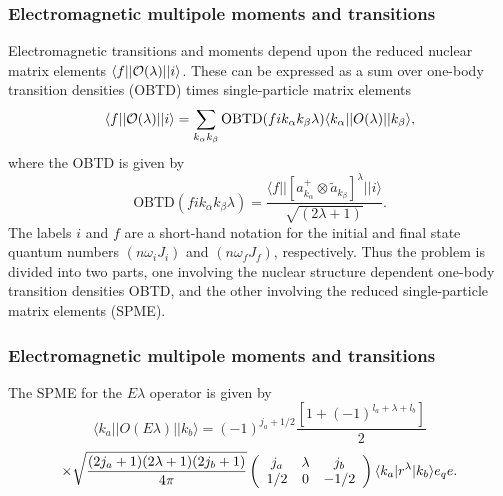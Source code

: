 \documentclass{beamer}
\begin{document}
\begin{frame}
\frametitle{Electromagnetic multipole moments and transitions}

\begin{block}{}
Electromagnetic transitions and moments depend upon the reduced nuclear
matrix elements $\langle f\vert\vert {\cal O}(\lambda )\vert\vert i\rangle$. These can be expressed as a sum over one-body transition
densities (OBTD) times single-particle matrix elements
\[
\langle f\vert\vert {\cal O}(\lambda )\vert\vert i\rangle
=\sum _{k_{\alpha } k_{\beta }}\mathrm{OBTD}(f i k_{\alpha } k_{\beta } \lambda )
 \langle k_{\alpha }\vert\vert O(\lambda )\vert\vert k_{\beta }\rangle, 
\]
where the OBTD is given by
\[
\mathrm{OBTD}(f i k_{\alpha} k_{\beta}\lambda)= \frac{\langle f\vert\vert [a^{+}_{k_{\alpha }}\otimes \tilde{a}_{k_{\beta }}]^{\lambda }\vert\vert i\rangle}{\sqrt{(2\lambda +1)}}. 
\]
The labels $i$ and $f$ are a short-hand notation for the initial
and final state quantum numbers $(n \omega _{i}J_{i})$ and $(n\omega_{f}J_{f})$,
respectively. Thus the problem is divided into two parts, one
involving the nuclear structure dependent one-body transition
densities OBTD, and the other involving the reduced
single-particle matrix
elements (SPME).
\end{block}
\end{frame}

\begin{frame}
\frametitle{Electromagnetic multipole moments and transitions}

\begin{block}{}
The SPME for the $E\lambda$ operator is given by
\[
\langle k_{a}\vert\vert O(E\lambda )\vert\vert k_{b}\rangle=(-1)^{j_{a}+1/2}\frac{[1+(-1)^{l_{a}+\lambda +l_{b}}]}{2}
\]
\[
 \times\sqrt{ {(2j_{a}+1)(2\lambda +1)(2j_{b}+1)\over4\pi }}\left(\begin{array}{ccc}  {j_{a}}&  {\lambda} &  {j_{b}}\\  {1/2} & {0}&  {-1/2}\end{array}\right)\langle k_{a}\vert r^{\lambda }\vert k_{b}\rangle e_{q} e.
\]
\end{block}
\end{frame}
\end{document}
